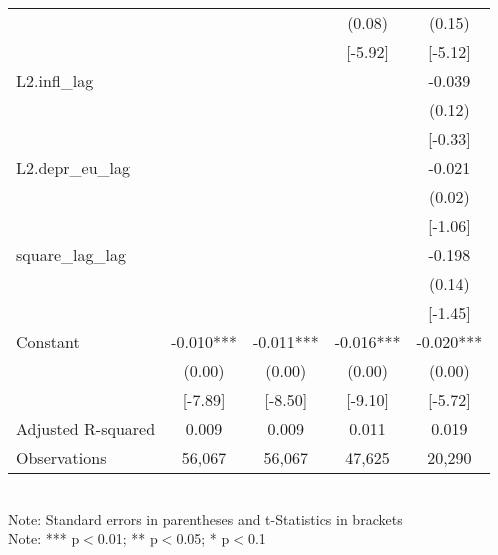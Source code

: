 \begin{table}
{\begin{tabular}{lcccc}
		                   &           &           &  (0.08)   &          (0.15)          \\
		                   &           &           &  [-5.92]  &         [-5.12]          \\
		L2.infl\_lag       &           &           &           &          -0.039          \\
		                   &           &           &           &          (0.12)          \\
		                   &           &           &           &         [-0.33]          \\
		L2.depr\_eu\_lag   &           &           &           &          -0.021          \\
		                   &           &           &           &          (0.02)          \\
		                   &           &           &           &         [-1.06]          \\
		square\_lag\_lag   &           &           &           &          -0.198          \\
		                   &           &           &           &          (0.14)          \\
		                   &           &           &           &         [-1.45]          \\ \hline
		Constant           & -0.010*** & -0.011*** & -0.016*** &        -0.020***         \\
		                   &  (0.00)   &  (0.00)   &  (0.00)   &          (0.00)          \\
		                   &  [-7.89]  &  [-8.50]  &  [-9.10]  &         [-5.72]          \\ \hline
		Adjusted R-squared &   0.009   &   0.009   &   0.011   &          0.019           \\
		Observations       &  56,067   &  56,067   &  47,625   &          20,290          \\ \hline\hline
	\end{tabular}
	\\Note: Standard errors in parentheses and t-Statistics in brackets
	\\Note: *** p$<$0.01; ** p$<$0.05; * p$<$0.1}
\end{table}
